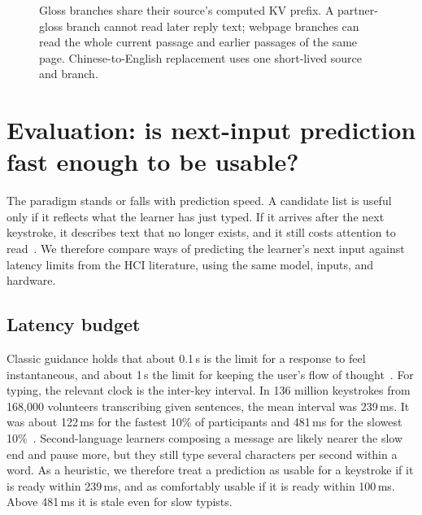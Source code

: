 \documentclass[11pt,a4paper]{article}
\begin{document}
\begin{figure}[ht]
\centering
{}
\caption{Gloss branches share their source's computed KV prefix. A partner-gloss branch cannot read later reply text; webpage branches can read the whole current passage and earlier passages of the same page. Chinese-to-English replacement uses one short-lived source and branch.}
\label{fig:architecture}
\end{figure}

\section{Evaluation: is next-input prediction fast enough to be usable?}
\label{sec:results}
The paradigm stands or falls with prediction speed. A candidate list is useful only if it reflects what the learner has just typed. If it arrives after the next keystroke, it describes text that no longer exists, and it still costs attention to read~\cite{quinn}. We therefore compare ways of predicting the learner's next input against latency limits from the HCI literature, using the same model, inputs, and hardware.

\subsection{Latency budget}
Classic guidance holds that about 0.1\,s is the limit for a response to feel instantaneous, and about 1\,s the limit for keeping the user's flow of thought~\cite{nielsen,miller,card}. For typing, the relevant clock is the inter-key interval. In 136 million keystrokes from 168,000 volunteers transcribing given sentences, the mean interval was 239\,ms. It was about 122\,ms for the fastest 10\% of participants and 481\,ms for the slowest 10\%~\cite{dhakal}. Second-language learners composing a message are likely nearer the slow end and pause more, but they still type several characters per second within a word. As a heuristic, we therefore treat a prediction as usable for a keystroke if it is ready within 239\,ms, and as comfortably usable if it is ready within 100\,ms. Above 481\,ms it is stale even for slow typists.
\end{document}
